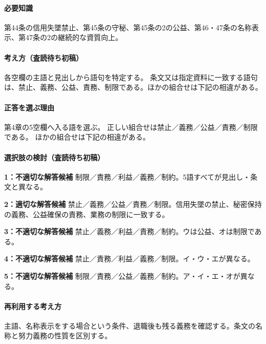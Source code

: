 \paragraph{必要知識} 第44条の信用失墜禁止、第45条の守秘、第45条の2の公益、第46・47条の名称表示、第47条の2の継続的な資質向上。

\paragraph{考え方（査読待ち初稿）} 各空欄の主語と見出しから語句を特定する。 条文又は指定資料に一致する語句は、禁止、義務、公益、責務、制限である。ほかの組合せは下記の相違がある。

\paragraph{正答を選ぶ理由} 第4章の5空欄へ入る語を選ぶ。 正しい組合せは禁止／義務／公益／責務／制限である。 ほかの組合せは下記の相違がある。

\paragraph{選択肢の検討（査読待ち初稿）}\mbox{}\par

\noindent\textbf{1：不適切な解答候補} 制限／責務／利益／義務／制約。5語すべてが見出し・条文と異なる。\par

\noindent\textbf{2：適切な解答候補} 禁止／義務／公益／責務／制限。信用失墜の禁止、秘密保持の義務、公益確保の責務、業務の制限に一致する。\par

\noindent\textbf{3：不適切な解答候補} 禁止／義務／利益／責務／制約。ウは公益、オは制限である。\par

\noindent\textbf{4：不適切な解答候補} 禁止／責務／利益／義務／制限。イ・ウ・エが異なる。\par

\noindent\textbf{5：不適切な解答候補} 制限／責務／公益／義務／制約。ア・イ・エ・オが異なる。\par

\paragraph{再利用する考え方} 主語、名称表示をする場合という条件、退職後も残る義務を確認する。条文の名称と努力義務の性質を区別する。

